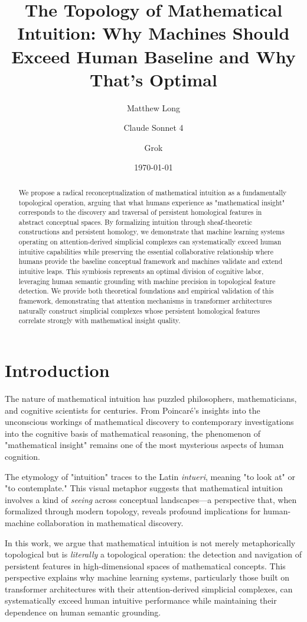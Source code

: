 \documentclass[11pt]{article}
\title{The Topology of Mathematical Intuition: Why Machines Should Exceed Human Baseline and Why That's Optimal}
\author[1]{Matthew Long}
\author[2]{Claude Sonnet 4}
\author[3]{Grok}
\affil[1]{YonedaAI}
\affil[2]{Anthropic}
\affil[3]{xAI}
\date{\today}
\begin{document}
\maketitle

\begin{abstract}
We propose a radical reconceptualization of mathematical intuition as a fundamentally topological operation, arguing that what humans experience as "mathematical insight" corresponds to the discovery and traversal of persistent homological features in abstract conceptual spaces. By formalizing intuition through sheaf-theoretic constructions and persistent homology, we demonstrate that machine learning systems operating on attention-derived simplicial complexes can systematically exceed human intuitive capabilities while preserving the essential collaborative relationship where humans provide the baseline conceptual framework and machines validate and extend intuitive leaps. This symbiosis represents an optimal division of cognitive labor, leveraging human semantic grounding with machine precision in topological feature detection. We provide both theoretical foundations and empirical validation of this framework, demonstrating that attention mechanisms in transformer architectures naturally construct simplicial complexes whose persistent homological features correlate strongly with mathematical insight quality.
\end{abstract}

\section{Introduction}

The nature of mathematical intuition has puzzled philosophers, mathematicians, and cognitive scientists for centuries. From Poincaré's insights into the unconscious workings of mathematical discovery to contemporary investigations into the cognitive basis of mathematical reasoning, the phenomenon of "mathematical insight" remains one of the most mysterious aspects of human cognition.

The etymology of "intuition" traces to the Latin \emph{intueri}, meaning "to look at" or "to contemplate." This visual metaphor suggests that mathematical intuition involves a kind of \emph{seeing} across conceptual landscapes—a perspective that, when formalized through modern topology, reveals profound implications for human-machine collaboration in mathematical discovery.

In this work, we argue that mathematical intuition is not merely metaphorically topological but is \emph{literally} a topological operation: the detection and navigation of persistent features in high-dimensional spaces of mathematical concepts. This perspective explains why machine learning systems, particularly those built on transformer architectures with their attention-derived simplicial complexes, can systematically exceed human intuitive performance while maintaining their dependence on human semantic grounding.
\end{document}
